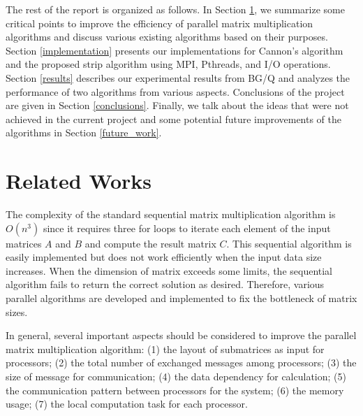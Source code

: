 \documentclass[conference]{IEEEtran}
\begin{document}
The rest of the report is organized as follows. In Section \ref{related_works}, we summarize some critical points to improve the efficiency of parallel matrix multiplication algorithms and discuss various existing algorithms based on their purposes.  Section \ref{implementation} presents our implementations for Cannon's algorithm and the proposed strip algorithm using MPI, Pthreads, and I/O operations. Section \ref{results} describes our experimental results from BG/Q and analyzes the performance of two algorithms from various aspects. Conclusions of the project are given in Section \ref{conclusions}. Finally, we talk about the ideas that were not achieved in the current project and some potential future improvements of the algorithms in Section \ref{future_work}. 



\section{Related Works}\label{related_works}
The complexity of the standard sequential matrix multiplication algorithm is $O(n^3)$ since it requires three for loops to iterate each element of the input matrices $A$ and $B$ and compute the result matrix $C$. This sequential algorithm is easily implemented but does not work efficiently when the input data size increases. When the dimension of matrix exceeds some limits, the sequential algorithm fails to return the correct solution as desired. Therefore, various parallel algorithms are developed and implemented to fix the bottleneck of matrix sizes. 

In general, several important aspects should be considered to improve the parallel matrix multiplication algorithm: (1) the layout of submatrices as input for processors; (2) the total number of exchanged messages among processors; (3) the size of message for communication; (4) the data dependency for calculation; (5) the communication pattern between processors for the system; (6) the memory usage; (7) the local computation task for each processor.
\end{document}
